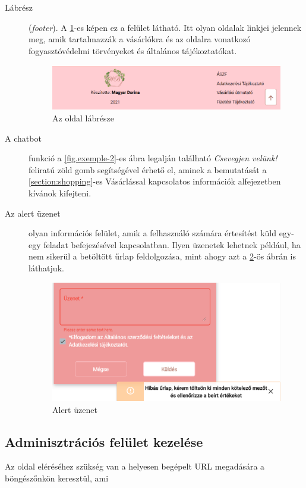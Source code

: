 \begin{description}
	\item[Lábrész] (\textit{footer}). A \ref{fig.exemple-4}-es képen ez a felület látható. Itt olyan oldalak linkjei jelennek meg, amik tartalmazzák a vásárlókra és az oldalra vonatkozó fogyasztóvédelmi törvényeket és általános tájékoztatókat.
	\begin{figure}[H]
		\centering
		\includegraphics[width=1.0\textwidth]{images/footer.png}
		\caption{Az oldal lábrésze}
		\label{fig.exemple-4}
	\end{figure}
	\item[A chatbot] funkció a \ref{fig.exemple-2}-es ábra legalján található \textit{Csevegjen velünk!} feliratú zöld gomb segítségével érhető el, aminek a bemutatását a \ref{section:shopping}-es Vásárlással kapcsolatos információk alfejezetben kívánok kifejteni.
	\item[Az alert üzenet] olyan információs felület, amik a felhasználó számára értesítést küld egy-egy feladat befejezésével kapcsolatban. Ilyen üzenetek lehetnek például, ha nem sikerül a betöltött űrlap feldolgozása, mint ahogy azt a \ref{fig.exemple-5}-ös ábrán is láthatjuk.
	\begin{figure}[H]
		\centering
		\includegraphics[width=1.0\textwidth]{images/alert_message.png}
		\caption{Alert üzenet}
		\label{fig.exemple-5}
	\end{figure}
\end{description}


\subsection{Adminisztrációs felület kezelése}
Az oldal eléréséhez szükség van a helyesen begépelt URL megadására a böngészőnkön keresztül, ami 

